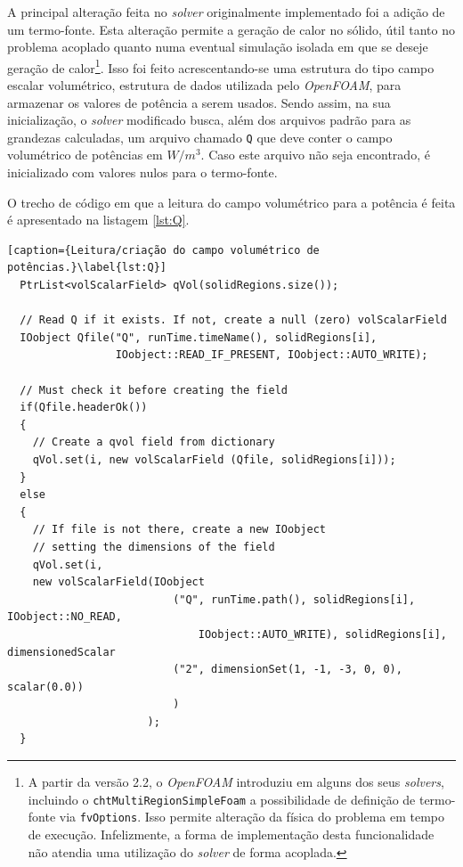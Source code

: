 A principal alteração feita no \textit{solver} originalmente implementado foi a adição de um termo-fonte.
Esta alteração permite a geração de calor no sólido, útil tanto no problema acoplado
quanto numa eventual simulação isolada em que se deseje geração de
calor\footnote{A partir da versão 2.2, o \textit{OpenFOAM} introduziu em alguns dos seus
\textit{solvers}, incluindo o \texttt{chtMultiRegionSimpleFoam} a possibilidade de definição
de termo-fonte via \texttt{fvOptions}. Isso permite alteração da física do problema em
tempo de execução. Infelizmente, a forma de implementação desta funcionalidade não atendia uma
utilização do \textit{solver} de forma acoplada.}. Isso foi feito acrescentando-se uma estrutura
do tipo campo escalar volumétrico, estrutura de dados utilizada pelo \textit{OpenFOAM},
para armazenar os valores de potência a serem usados. Sendo assim, na sua inicialização,
o \textit{solver} modificado busca, além dos arquivos padrão para as grandezas calculadas, um
arquivo chamado \texttt{Q} que deve conter o campo volumétrico de potências em $W/m^3$. Caso
este arquivo não seja encontrado, é inicializado com valores nulos para o termo-fonte.

O trecho de código em que a leitura do campo volumétrico para a potência é feita
é apresentado na listagem \ref{lst:Q}.

\begin{lstlisting}[caption={Leitura/criação do campo volumétrico de potências.}\label{lst:Q}]
  PtrList<volScalarField> qVol(solidRegions.size());

  // Read Q if it exists. If not, create a null (zero) volScalarField
  IOobject Qfile("Q", runTime.timeName(), solidRegions[i],
                 IOobject::READ_IF_PRESENT, IOobject::AUTO_WRITE);

  // Must check it before creating the field
  if(Qfile.headerOk())
  {
    // Create a qvol field from dictionary
    qVol.set(i, new volScalarField (Qfile, solidRegions[i]));
  }
  else
  {
    // If file is not there, create a new IOobject
    // setting the dimensions of the field
    qVol.set(i,
    new volScalarField(IOobject
                          ("Q", runTime.path(), solidRegions[i], IOobject::NO_READ,
                              IOobject::AUTO_WRITE), solidRegions[i], dimensionedScalar
                          ("2", dimensionSet(1, -1, -3, 0, 0), scalar(0.0))
                          )
                      );
  }
\end{lstlisting}

